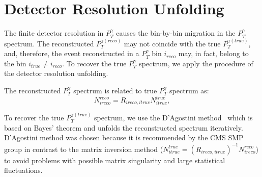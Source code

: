 \section{Detector Resolution Unfolding}
\label{sec:Unfolding}



The finite detector resolution in $P_T^\gamma$ causes the bin-by-bin migration in the $P_T^{\gamma}$ spectrum. The reconstructed $P_T^{\gamma(reco)}$ may not coincide with the true $P_T^{\gamma(true)}$, and, therefore, the event reconstructed in a $P_T^{\gamma}$ bin $i_{reco}$ may, in fact, belong to the bin $i_{true} \neq i_{reco}$. To recover the true $P_T^{\gamma}$ spectrum, we apply the procedure of the detector resolution unfolding.

The reconstructed $P_T^{\gamma}$ spectrum is related to true $P_T^{\gamma}$ spectrum as:
\begin{equation}
  N^{reco}_{ireco} = R_{ireco,itrue} N^{true}_{itrue},
\end{equation}

To recover the true $P_T^{\gamma(true)}$ spectrum, we use the D'Agostini method~\cite{ref_DAgostini} which is based on Bayes' theorem and unfolds the reconstructed spectrum iteratively. D'Agostini method was chosen because it is recommended by the CMS SMP group in contrast to the matrix inversion method ($N^{true}_{itrue} = \left( R_{ireco,itrue} \right) ^{-1} N^{reco}_{ireco}$) to avoid problems with possible matrix singularity and large statistical fluctuations.

